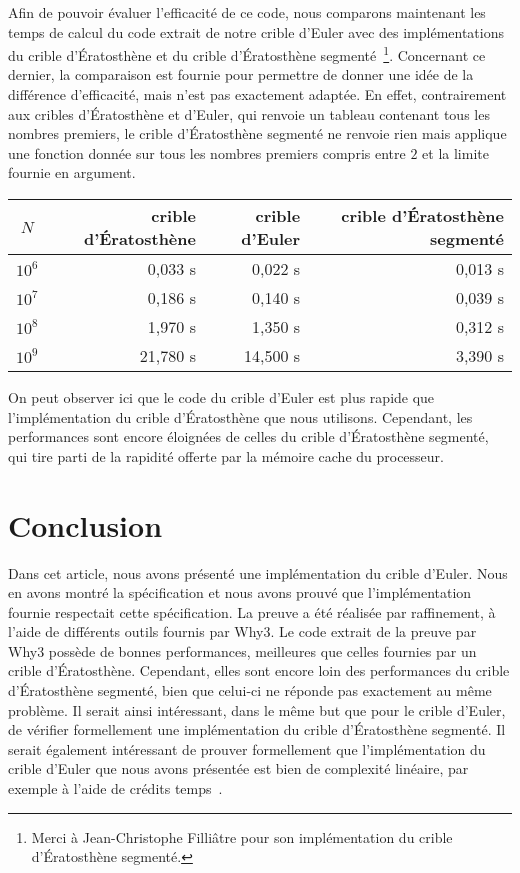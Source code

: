 \documentclass[a4paper]{easychair}
\begin{document}
Afin de pouvoir évaluer l'efficacité de ce code, nous comparons maintenant
les temps de calcul du code extrait de notre crible d'Euler avec des
implémentations du crible d'Ératosthène et du crible d'Ératosthène
segmenté~\footnote{Merci à
  Jean-Christophe Filliâtre pour son implémentation du crible d'Ératosthène
  segmenté.}.
Concernant ce dernier, la comparaison est fournie pour permettre de donner
une idée de la différence d'efficacité, mais n'est pas exactement adaptée.
En effet, contrairement aux cribles d'Ératosthène et d'Euler, qui renvoie
un tableau contenant tous les nombres premiers, le crible d'Ératosthène
segmenté ne renvoie rien mais applique une fonction donnée sur tous les
nombres premiers compris entre $2$ et la limite fournie en argument.
\begin{center}
  \begin{tabular}{|c|r|r|r|}
    \hline
    $N$ & crible d'Ératosthène & crible d'Euler &
    \multicolumn{1}{|p{3.1cm}|}{crible d'Ératosthène segmenté}\\
    \hline\hline
    $10^6$ &  0,033 s &  0,022 s &  0,013 s \\\hline
    $10^7$ &  0,186 s &  0,140 s &  0,039 s \\\hline
    $10^8$ &  1,970 s &  1,350 s &  0,312 s \\\hline
    $10^9$ & 21,780 s & 14,500 s &  3,390 s \\\hline
  \end{tabular}
\end{center}
On peut observer ici que le code du crible d'Euler est plus rapide
que l'implémentation du crible d'Ératosthène que nous utilisons.
Cependant, les performances sont encore éloignées de celles du crible
d'Ératosthène segmenté, qui tire parti de la rapidité offerte
par la mémoire cache du processeur.

\section{Conclusion}
\label{sec:conclusion}

Dans cet article, nous avons présenté une implémentation du crible d'Euler.
Nous en avons montré la spécification et nous avons prouvé que
l'implémentation fournie respectait cette spécification.
La preuve a été réalisée par raffinement, à l'aide de différents outils
fournis par Why3.
Le code extrait de la preuve par Why3 possède de bonnes performances,
meilleures que celles fournies par un crible d'Ératosthène.
Cependant, elles sont encore loin des performances du crible d'Ératosthène
segmenté, bien que celui-ci ne réponde pas exactement au même problème.
Il serait ainsi intéressant, dans le même but que pour le crible d'Euler,
de vérifier formellement une implémentation du crible d'Ératosthène
segmenté.
Il serait également intéressant de prouver formellement
que l'implémentation du crible
d'Euler que nous avons présentée est bien de complexité linéaire, par
exemple
à l'aide de crédits temps~\cite{chargueraud-pottier-uf-sltc-19}.
\end{document}
